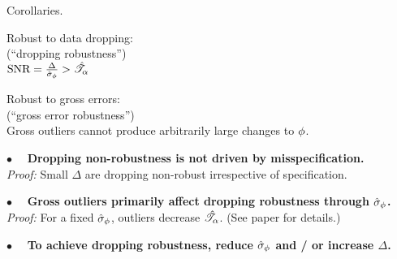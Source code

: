 
\begin{frame}[t]{Corollaries.}
%
\begin{minipage}[t]{0.45\textwidth}
\begin{center}
    Robust to data dropping:\\
    (``dropping robustness'')\\
    \vspace{1em}
    $\textrm{SNR} = \frac{\Delta}{\hat\sigma_{\phi}} > \hat{\mathscr{T}}_\alpha$
\end{center}
\end{minipage}
%
\begin{minipage}[t]{0.45\textwidth}
\begin{center}
    Robust to gross errors:\\
    (``gross error robustness'')\\
    \vspace{1em}
    Gross outliers cannot produce
    arbitrarily large changes to $\phi$.
\end{center}
\end{minipage}

\vspace{1em}
\hrulefill

\vspace{1em} $\bullet\quad$
\textbf{Dropping non-robustness is not driven by misspecification.\\}
\textit{Proof: }
Small $\Delta$ are dropping non-robust irrespective of specification.

\vspace{1em} $\bullet\quad$
\textbf{Gross outliers primarily affect dropping robustness through $\hat\sigma_{\phi}$.\\}
\textit{Proof: }
For a fixed $\hat\sigma_{\phi}$, outliers decrease $\hat{\mathscr{T}}_\alpha$.
(See paper for details.)

\vspace{1em} $\bullet\quad$
\textbf{To achieve dropping robustness,
reduce $\hat\sigma_{\phi}$ and / or increase $\Delta$.\\}

\end{frame}
